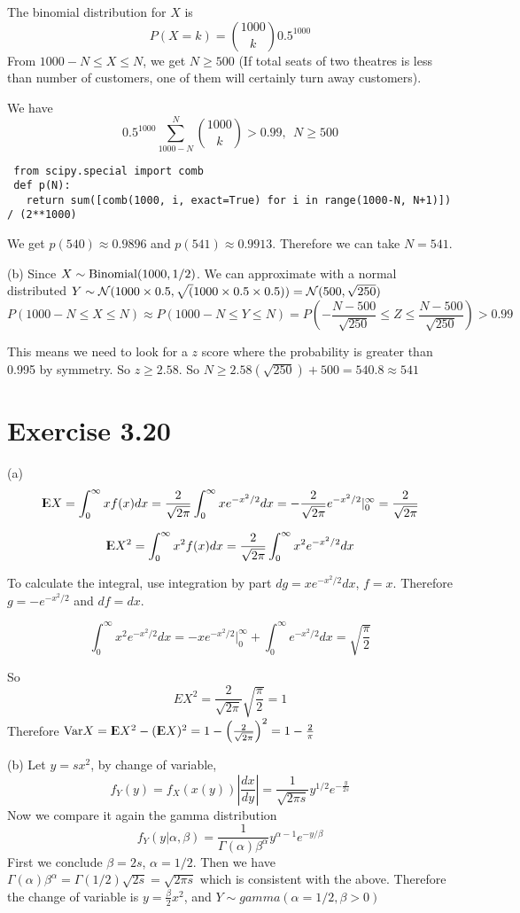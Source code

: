 \documentclass[12pt]{article}
\begin{document}
The binomial distribution for $X$ is $$ P(X = k) = {1000 \choose k} 0.5^{1000}$$
From $1000 -N \leq X \leq N$, we get $N \geq 500$ (If total seats of two theatres is less than number of customers, one of them will certainly turn away customers).

We have
$$ 0.5^{1000} \sum^{N}_{1000-N} {1000 \choose k} > 0.99, \ \ N \geq 500$$
\begin{lstlisting}
 from scipy.special import comb
 def p(N):
   return sum([comb(1000, i, exact=True) for i in range(1000-N, N+1)]) / (2**1000)
\end{lstlisting}
We get $p(540) \approx 0.9896$ and $p(541) \approx 0.9913$. Therefore we can take $N = 541$.

(b) Since $X \sim \mathrm{Binomial} (1000, 1/2)$. We can approximate with a normal distributed $Y \sim \mathcal{N} (1000 \times 0.5, \sqrt(1000 \times 0.5 \times 0.5)) = \mathcal{N} (500, \sqrt{250})$
$$ P(1000- N \leq X \leq N) \approx P( 1000 - N \leq Y \leq N) = P(- \frac{N - 500}{\sqrt{250}} \leq Z \leq \frac{N - 500}{\sqrt{250}}) > 0.99$$

This means we need to look for a $z$ score where the probability is greater than 0.995 by symmetry. So $z \geq 2.58$. So $N \geq 2.58 (\sqrt{250}) + 500 = 540.8 \approx 541$

\section*{Exercise 3.20}
(a) $$ {\rm I\kern-.3em E} X = \int^{\infty}_{0} xf(x) dx = \frac{2}{\sqrt{2\pi}} \int^{\infty}_{0} x e^{-x^2/2} dx
 = - \frac{2}{\sqrt{2\pi}} e^{-x^2/2} |^{\infty}_{0} =  \frac{2}{\sqrt{2\pi}}$$
 
 $${\rm I\kern-.3em E} X^2 = \int^{\infty}_{0} x^2f(x) dx =  \frac{2}{\sqrt{2\pi}} \int^{\infty}_{0} x^2 e^{-x^2/2} dx$$
 
To calculate the integral, use integration by part $dg = x e^{-x^2/2}dx$, $f = x$. Therefore $g = -e^{-x^2/2}$ and $df=dx$. 

$$\int^{\infty}_{0} x^2 e^{-x^2/2} dx = -xe^{-x^2/2}|^{\infty}_{0} + \int^{\infty}_{0} e^{-x^2/2} dx = \sqrt{\frac{\pi}{2}}$$

So $$EX^2 = \frac{2}{\sqrt{2\pi}}  \sqrt{\frac{\pi}{2}} = 1$$
Therefore $\mathrm{Var} X = {\rm I\kern-.3em E} X^2 - ({\rm I\kern-.3em E} X)^2 = 1 - \left( \frac{2}{\sqrt{2\pi}}\right)^2 = 1 - \frac{2}{\pi}$ 

(b) Let $y=sx^2$, by change of variable,
$$ f_Y(y) = f_X(x(y)) \left| \frac{dx}{dy} \right| = \frac{1}{\sqrt{2\pi s}} y^{1/2} e^{-\frac{y}{2s}}$$
Now we compare it again the gamma distribution $$ f_Y(y|\alpha, \beta) = \frac{1}{\Gamma(\alpha)\beta^{\alpha}} y^{\alpha - 1} e^{-y/\beta}$$
First we conclude $\beta = 2s$, $\alpha = 1/2$. Then we have $\Gamma(\alpha)\beta^{\alpha} = \Gamma(1/2)\sqrt{2s} = \sqrt{2\pi s}$ which is consistent with the above. Therefore the change of variable is $y = \frac{\beta}{2} x^2$, and $Y \sim gamma(\alpha=1/2, \beta > 0)$
\end{document}
